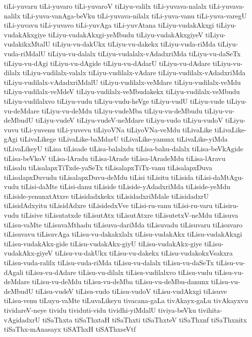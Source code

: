 {tiLi-yuvaru
tiLi-yuvaro
tiLi-yuvaroV
tiLiyu-valilx
tiLi-yuvava-nalalx
tiLi-yuvava-nalilx
tiLi-yuva-vanAga-beVku
tiLi-yuvava-nilalx
tiLi-yuva-vanu
tiLi-yuva-varegU
tiLi-yuvavu
tiLi-yuvavo
tiLi-yuvAga
tiLi-yuvAtana
tiLiyu-vudakAkxgi
tiLiyu-vudakAkxgiye
tiLiyu-vudakAkxgi-yeMbudu
tiLiyu-vudakAkxgiyeV
tiLiyu-vudakikxMtalU
tiLiyu-vu-dakUkx
tiLiyu-vu-dakekx
tiLiyu-vuda-riMda
tiLiyu-vuda-riMdalU
tiLiyu-vu-dalalx
tiLiyu-vudalalx-vAdadxriMda
tiLiyu-vu-daSeTx
tiLiyu-vu-dAgi
tiLiyu-vu-dAgide
tiLiyu-vu-dAdarU
tiLiyu-vu-dAdare
tiLiyu-vu-dilalx
tiLiyu-vudilalx-valalx
tiLiyu-vudilalx-vAdare
tiLiyu-vudilalx-vAdadxriMda
tiLiyu-vudilalx-vAdadxriMdalU
tiLiyu-vudilalx-veMdare
tiLiyu-vudilalx-veMdu
tiLiyu-vudilalx-veMdeV
tiLiyu-vudilalx-veMbudakekx
tiLiyu-vudilalx-veMbudu
tiLiyu-vudilalxvo
tiLiyu-vudu
tiLiyu-vudu-heVge
tiLiyu-vudU
tiLiyu-vude
tiLiyu-vu-deMdare
tiLiyu-vu-deMdu
tiLiyu-vudeMba
tiLiyu-vu-deMbudu
tiLiyu-vu-deMbudU
tiLiyu-vudeV
tiLiyu-vudeV-neMdare
tiLiyu-vudo
tiLiyu-vudoV
tiLiyu-vuvu
tiLi-yuvenu
tiLi-yuvevu
tiLiyoVNa
tiLiyoVNa-veMdu
tiLivaLike
tiLivaLike-gAgi
tiLivaLikege
tiLivaLike-baMdarU
tiLivaLike-yanunx
tiLivaLike-yiMda
tiLivaLikeyU
tiLisa
tiLisade
tiLisa-balalxdu
tiLisa-bahu-dalalx
tiLisa-beVkAgide
tiLisa-beVkoV
tiLisa-lAradu
tiLisa-lArade
tiLisa-lAradeMdu
tiLisa-lAravu
tiLisalu
tiLisalapxTiTxde-yaSeTx
tiLisalapxTiTx-vanu
tiLisalapxDuva
tiLisalapxDuvudu
tiLisalapxDuvu-deMdu
tiLisi
tiLisitu
tiLisida
tiLisi-daMtAgu-vudu
tiLisi-daMte
tiLisi-danu
tiLiside
tiLiside-yAdadxriMda
tiLiside-yeMdu
tiLiside-yenunxtAtxre
tiLisidadxkekx
tiLisidadxriMdale
tiLisidadxrU
tiLisidAdxyitu
tiLisidAdxre
tiLisidedxVve
tiLisi-ru-vanu
tiLisi-ru-varu
tiLisiru-vudu
tiLisive
tiLisutatxde
tiLisutAtx
tiLisutAtxre
tiLisutetxV-neMdu
tiLisuva
tiLisu-vaMte
tiLisuvaMthadu
tiLisuva-dariMda
tiLisuvadu
tiLisuvaru
tiLisuvaro
tiLisuvavu
tiLisuvAga
tiLisu-vu-dakakxlalx
tiLisu-vudakAkx
tiLisu-vudakAkxgi
tiLisu-vudakAkx-gide
tiLisu-vudakAkx-giyU
tiLisu-vudakAkx-giye
tiLisu-vudakAkx-giyeV
tiLisu-vu-dakUkx
tiLisu-vu-dakekx
tiLisu-vudakokxVsakxra
tiLisu-vuda-ralilx
tiLisu-vuda-riMda
tiLisu-vu-dalalx
tiLisu-vu-daSeTx
tiLisu-vu-dAgali
tiLisu-vu-dAdare
tiLisu-vu-dilalx
tiLisu-vudilalxvo
tiLisu-vudu
tiLisu-vu-deMdare
tiLisu-vu-deMdu
tiLisu-vu-deMba
tiLisu-vu-deMbu-danunx
tiLisu-vu-deMbudU
tiLisu-vudeV
tiLisu-vudo
tiLisu-vudoV
tiLisu-vudAkxgi
tiLisuve
tiLisu-venu
tiLuyu-vaMte
tiLuvaLikeyu
tivacana-gaLa
tivAkayx-gaLu
tivAkayxvu
tividareV-neye
tividu
tividuti-vidu
tividhi-yiMdalU
tiviya-beVku
tivihita-vAgidadxrU
tiSaThxta
tiSaThxtaH
tiSaThxti
tiSaThxteV
tiSaThxnf
tiSaThxnitx
tiSaThx-mAnasayx
tiSAThxH
tiSAThxseVtf
}
